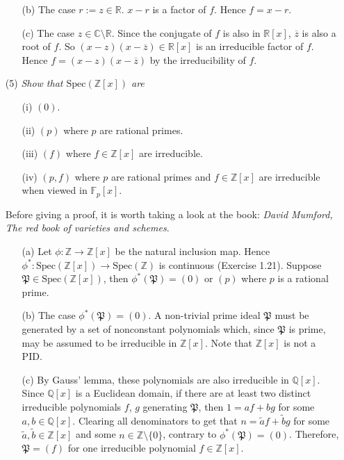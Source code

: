 \documentclass{article}
\begin{document}
\begin{enumerate}
\begin{enumerate}
  \item[(b)]
    The case $r := z \in \mathbb{R}$.
    $x - r$ is a factor of $f$.
    Hence $f = x - r$.

  \item[(c)]
    The case $z \in \mathbb{C} \setminus \mathbb{R}$. 
    Since the conjugate of $f$ is also in $\mathbb{R}[x]$, $\overline{z}$ is also a root of $f$.
    So $(x - z)(x - \overline{z}) \in \mathbb{R}[x]$ is an irreducible factor of $f$.
    Hence $f = (x - z)(x - \overline{z})$ by the irreducibility of $f$.
  \end{enumerate}

\item[(5)]
  \emph{Show that $\mathrm{Spec}(\mathbb{Z}[x])$ are}
  \begin{enumerate}
  \item[(i)]
    $(0)$.
  \item[(ii)]
    $(p)$ where $p$ are rational primes.
  \item[(iii)]
    $(f)$ where $f \in \mathbb{Z}[x]$ are irreducible.
  \item[(iv)]
    $(p,f)$ where $p$ are rational primes and
    $f \in \mathbb{Z}[x]$ are irreducible when viewed in $\mathbb{F}_p[x]$.
  \end{enumerate}
  Before giving a proof, it is worth taking a look at the book:
  \emph{David Mumford, The red book of varieties and schemes}.

  \begin{enumerate}
  \item[(a)]
    Let $\phi: \mathbb{Z} \to \mathbb{Z}[x]$ be the natural inclusion map.
    Hence $\phi^{*}: \mathrm{Spec}(\mathbb{Z}[x]) \to \mathrm{Spec}(\mathbb{Z})$ is continuous
    (Exercise 1.21).
    Suppose $\mathfrak{P} \in \mathrm{Spec}(\mathbb{Z}[x])$,
    then $\phi^{*}(\mathfrak{P}) = (0)$ or $(p)$ where $p$ is a rational prime.

  \item[(b)]
    The case $\phi^{*}(\mathfrak{P}) = (0)$.
    A non-trivial prime ideal $\mathfrak{P}$ must be generated by a set of nonconstant polynomials which,
    since $\mathfrak{P}$ is prime,
    may be assumed to be irreducible in $\mathbb{Z}[x]$.
    Note that $\mathbb{Z}[x]$ is not a PID.

  \item[(c)]
    By Gauss' lemma, these polynomials are also irreducible in $\mathbb{Q}[x]$.
    Since $\mathbb{Q}[x]$ is a Euclidean domain,
    if there are at least two distinct irreducible polynomials $f$, $g$ generating $\mathfrak{P}$,
    then $1 = af + bg$ for some $a, b \in \mathbb{Q}[x]$.
    Clearing all denominators to get that
    $n = \widetilde{a}f + \widetilde{b}g$ for some $\widetilde{a}, \widetilde{b} \in \mathbb{Z}[x]$ and
    some $n \in \mathbb{Z} \setminus \{0\}$, contrary to $\phi^{*}(\mathfrak{P}) = (0)$.
    Therefore, $\mathfrak{P} = (f)$ for one irreducible polynomial $f \in \mathbb{Z}[x]$.


\end{enumerate}
\end{enumerate}
\end{document}
